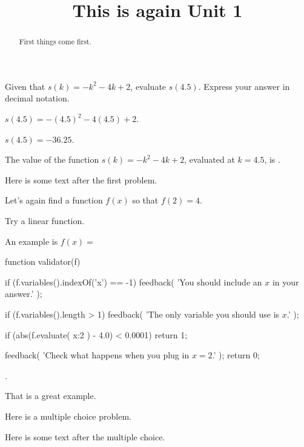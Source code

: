 \documentclass{ximera}
\title{This is again Unit 1}
\begin{document}
\begin{abstract}
  First things come first.
\end{abstract}


\begin{exercise}
Given that $s(k)=-k^2-4 k+2$, evaluate $s(4.5)$. Express your answer in decimal notation.
\begin{solution}
\begin{hint}
$s(4.5)=-(4.5)^2-4 (4.5)+2$.
\end{hint}
\begin{hint}
$s(4.5)=-36.25$.
\end{hint}
The value of the function $s(k)=-k^2-4 k+2$, evaluated at $k=4.5$, is .
\end{solution}

Here is some text after the first problem.
\end{exercise}


\begin{exercise}
Let's again find a function $f(x)$ so that $f(2) = 4$.

\begin{solution}
\begin{hint}
Try a linear function.
\end{hint}
An example is $f(x) = $ \begin{expression-answer}
  function validator(f) {
    if (f.variables().indexOf('x') == -1) {
      feedback( 'You should include an $x$ in your answer.' );
    }

    if (f.variables().length > 1) {
      feedback( 'The only variable you should use is $x$.' );
    }

    if (abs(f.evaluate( {x:2} ) - 4.0) < 0.0001)
      return 1;

    feedback( 'Check what happens when you plug in $x=2$.' );
    return 0;
  }
\end{expression-answer}.
\end{solution}

That is a great example.
\end{exercise}

\begin{exercise}
  Here is a multiple choice problem.

  \begin{solution}
    \begin{multiple-choice}
    \end{multiple-choice}
  \end{solution}

  Here is some text after the multiple choice.
\end{exercise}
\end{document}

